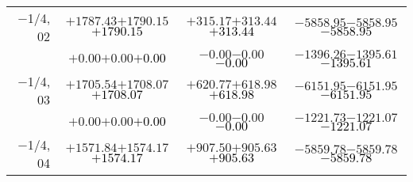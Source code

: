\documentclass[compress]{beamer}
\begin{document}
\begin{frame}
{\begin{tabular}{r | c | c | c}
$-$1/4, 02 & $+1787.43$\hspace{0.1 cm}$+1790.15$\hspace{0.1 cm}\textcolor{black}{$+1790.15$} & $+315.17$\hspace{0.1 cm}$+313.44$\hspace{0.1 cm}\textcolor{black}{$+313.44$} & $-5858.95$\hspace{0.1 cm}$-5858.95$\hspace{0.1 cm}\textcolor{black}{$-5858.95$} \\
           & $+0.00$\hspace{0.1 cm}$+0.00$\hspace{0.1 cm}\textcolor{black}{$+0.00$} & $-0.00$\hspace{0.1 cm}$-0.00$\hspace{0.1 cm}\textcolor{black}{$-0.00$} & $-1396.26$\hspace{0.1 cm}$-1395.61$\hspace{0.1 cm}\textcolor{black}{$-1395.61$} \\
$-$1/4, 03 & $+1705.54$\hspace{0.1 cm}$+1708.07$\hspace{0.1 cm}\textcolor{black}{$+1708.07$} & $+620.77$\hspace{0.1 cm}$+618.98$\hspace{0.1 cm}\textcolor{black}{$+618.98$} & $-6151.95$\hspace{0.1 cm}$-6151.95$\hspace{0.1 cm}\textcolor{black}{$-6151.95$} \\
           & $+0.00$\hspace{0.1 cm}$+0.00$\hspace{0.1 cm}\textcolor{black}{$+0.00$} & $-0.00$\hspace{0.1 cm}$-0.00$\hspace{0.1 cm}\textcolor{black}{$-0.00$} & $-1221.73$\hspace{0.1 cm}$-1221.07$\hspace{0.1 cm}\textcolor{black}{$-1221.07$} \\
$-$1/4, 04 & $+1571.84$\hspace{0.1 cm}$+1574.17$\hspace{0.1 cm}\textcolor{black}{$+1574.17$} & $+907.50$\hspace{0.1 cm}$+905.63$\hspace{0.1 cm}\textcolor{black}{$+905.63$} & $-5859.78$\hspace{0.1 cm}$-5859.78$\hspace{0.1 cm}\textcolor{black}{$-5859.78$} \\

\end{tabular}}
\end{frame}
\end{document}
